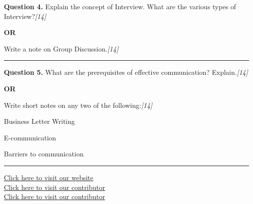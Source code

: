 \documentclass[11pt,a4paper]{article}
\newcommand{\pts}[1]{\hfill   \textit{[#1]}}
\begin{document}
\noindent   \textbf{Question 4.}
Explain the concept of Interview. What are the various types of Interview?\pts{14}

\centerline{   \textbf{OR}}

Write a note on Group Discussion.\pts{14}

\medskip\rule{\linewidth}{0.2pt}




\noindent   \textbf{Question 5.}
What are the prerequisites of effective communication? Explain.\pts{14}

\centerline{   \textbf{OR}}

Write short notes on any two of the following:\pts{14}

\begin{parts}
  \item Business Letter Writing
  \item E-communication
  \item Barriers to communication
\end{parts}

\vfill
\rule{\linewidth}{0.4pt}

\begin{center}\small
\href{https://bhu-exam.vercel.app/}{Click here to visit our website}\\[4pt]
\href{https://me-aryan.vercel.app/}{Click here to visit our contributor}\\[4pt]
\href{https://quashan-me.vercel.app/}{Click here to visit our contributor}
\end{center}
\end{document}
